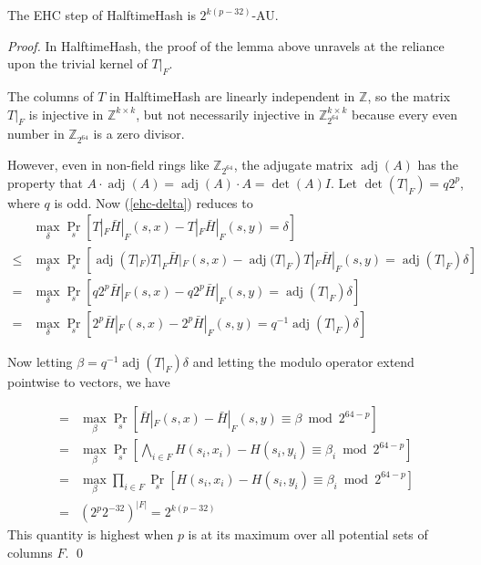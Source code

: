 \documentclass[runningheads]{llncs}
\DeclareMathOperator{\adj}{adj}
\newcommand{\ints}{\mathbb{Z}}
\begin{document}
\begin{theorem}
  The EHC step of HalftimeHash is $2^{k(p-32)}$-AU.
\end{theorem}

\begin{proof}
  In HalftimeHash, the proof of the lemma above unravels at the reliance upon the trivial kernel of $T|_F$.

  The columns of $T$ in HalftimeHash are linearly independent in $\ints$, so the matrix $T|_F$ is injective in $\ints^{k\times{}k}$, but not necessarily injective in $\ints_{2^{64}}^{k\times{}k}$ because every even number in $\ints_{2^{64}}$ is a zero divisor.

  However, even in non-field rings like $\ints_{2^{64}}$, the adjugate matrix $\adj(A)$ has the property that $A \cdot \adj(A) = \adj(A) \cdot A = \det(A) I$.
  Let $\det(T|_F) = q2^p$, where $q$ is odd.
  Now (\ref{ehc-delta}) reduces to
  \[
  \begin{array}{rl}
    &  \max_\delta \Pr_s[T|_F \bar{H}|_F(s,x) - T|_F \bar{H}|_F(s,y) = \delta]\\
    \leq & \max_\delta \Pr_s[\adj(T|_F) T|_F \bar{H}|_F(s,x) - \adj(T|_F) T|_F \bar{H}|_F(s,y) = \adj(T|_F) \delta] \\
    = & \max_\delta \Pr_s[q2^p\bar{H}|_F(s,x) - q2^p\bar{H}|_F(s,y) = \adj(T|_F) \delta] \\
    = & \max_\delta \Pr_s[2^p\bar{H}|_F(s,x) - 2^p\bar{H}|_F(s,y) = q^{-1} \adj(T|_F) \delta]
  \end{array}
  \]

  Now letting $\beta = q^{-1} \adj(T|_F) \delta$ and letting the modulo operator extend pointwise to vectors, we have

  \[
  \begin{array}{rl}
    = & \max_\beta \Pr_s[\bar{H}|_F(s,x) - \bar{H}|_F(s,y) \equiv \beta \bmod 2^{64-p}] \\
    = & \max_\beta \Pr_s\left[\bigwedge_{i \in F} H(s_i,x_i) - H(s_i,y_i) \equiv \beta_i \bmod 2^{64-p}\right] \\
    = & \max_\beta \prod_{i \in F} \Pr_s\left[ H(s_i,x_i) - H(s_i,y_i) \equiv \beta_i \bmod 2^{64-p}\right] \\
    = & \left(2^p 2^{-32}\right)^{|F|} = 2^{k(p-32)}
  \end{array}
  \]
  This quantity is highest when $p$ is at its maximum over all potential sets of columns $F$. \qed

\end{proof}
\end{document}
